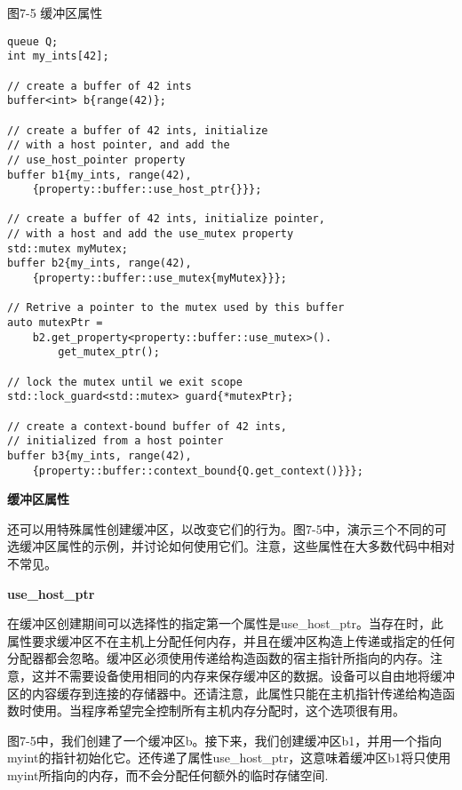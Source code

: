 \hspace*{\fill} \par %
图7-5 缓冲区属性
\begin{lstlisting}[caption={}]
queue Q;
int my_ints[42];

// create a buffer of 42 ints
buffer<int> b{range(42)};

// create a buffer of 42 ints, initialize 
// with a host pointer, and add the 
// use_host_pointer property
buffer b1{my_ints, range(42),
	{property::buffer::use_host_ptr{}}};

// create a buffer of 42 ints, initialize pointer,
// with a host and add the use_mutex property
std::mutex myMutex;
buffer b2{my_ints, range(42), 
	{property::buffer::use_mutex{myMutex}}};

// Retrive a pointer to the mutex used by this buffer
auto mutexPtr =
	b2.get_property<property::buffer::use_mutex>().
		get_mutex_ptr();
		
// lock the mutex until we exit scope
std::lock_guard<std::mutex> guard{*mutexPtr};

// create a context-bound buffer of 42 ints, 
// initialized from a host pointer
buffer b3{my_ints, range(42), 
	{property::buffer::context_bound{Q.get_context()}}};
\end{lstlisting}

\hspace*{\fill} \par %
\textbf{缓冲区属性}

还可以用特殊属性创建缓冲区，以改变它们的行为。图7-5中，演示三个不同的可选缓冲区属性的示例，并讨论如何使用它们。注意，这些属性在大多数代码中相对不常见。\par

\hspace*{\fill} \par %
\textbf{use\_host\_ptr}

在缓冲区创建期间可以选择性的指定第一个属性是use\_host\_ptr。当存在时，此属性要求缓冲区不在主机上分配任何内存，并且在缓冲区构造上传递或指定的任何分配器都会忽略。缓冲区必须使用传递给构造函数的宿主指针所指向的内存。注意，这并不需要设备使用相同的内存来保存缓冲区的数据。设备可以自由地将缓冲区的内容缓存到连接的存储器中。还请注意，此属性只能在主机指针传递给构造函数时使用。当程序希望完全控制所有主机内存分配时，这个选项很有用。\par

图7-5中，我们创建了一个缓冲区b。接下来，我们创建缓冲区b1，并用一个指向myint的指针初始化它。还传递了属性use\_host\_ptr，这意味着缓冲区b1将只使用myint所指向的内存，而不会分配任何额外的临时存储空间.\par

